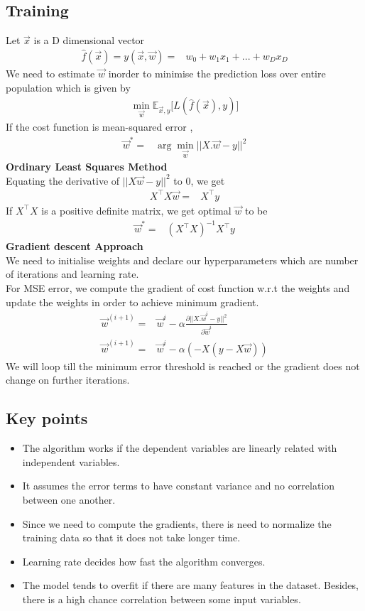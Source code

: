 \documentclass[12pt,letterpaper, onecolumn]{exam}
\begin{document}
\subsection*{Training}
Let $\vec{x}$ is a D dimensional vector
\begin{align}
\hat{f}(\vec{x}) = y(\vec{x}, \vec{w}) ={}& w_0 + w_1x_1 + ... + w_Dx_D
\end{align}
We need to estimate $\vec{w}$ inorder to minimise the prediction loss over entire population which is given by
\begin{align}
\min_{\vec{w}}\mathbb{E}_{\vec{x},y}\big[L(\hat{f}(\vec{x}),y)\big]
\end{align}
If the cost function is mean-squared error ,
\begin{align}
\label{der}
\vec{w}^{*} ={}&  \arg \min_{\vec{w}}||X.\vec{w} - y||^2
\end{align}
\textbf{Ordinary Least Squares Method}\\
Equating the derivative of  $||X\vec{w} - y||^2$ to 0, we get
\begin{align}
X^\top X\vec{w} ={}& X^\top y
\end{align}
If $X^\top X$ is a positive definite matrix, we get optimal $\vec{w}$  to be
\begin{align}
\vec{w}^{*} ={}&(X^\top X)^{-1} X^\top y
\end{align}
\textbf{Gradient descent Approach}\\
We need to initialise weights and declare our hyperparameters which are number of iterations and learning rate.\\
For MSE error, we compute the gradient of cost function w.r.t the weights and update the weights in order to achieve minimum gradient.
\begin{align}
\vec{w}^{(i+1)} ={}& \vec{w}^{i} - \alpha\frac{\partial ||X.\vec{w}^i - y||^2}{\partial \vec{w}^i}\\
\vec{w}^{(i+1)} ={}& \vec{w}^{i} - \alpha (-X(y-X\vec{w}))
\end{align}
We will loop till the minimum error threshold is reached or the gradient does not change on further iterations.

\subsection*{Key points}
\begin{itemize}
\item The algorithm works if the dependent variables are linearly related with independent variables.
\item It assumes the error terms to have constant variance and no correlation between one another.
\item Since we need to compute the gradients, there is need to normalize the training data so that it does not take longer time.
\item Learning rate decides how fast the algorithm converges.
\item The model tends to overfit if there are many features in the dataset. Besides, there is a high chance correlation between some input variables.
\end{itemize}
\end{document}

